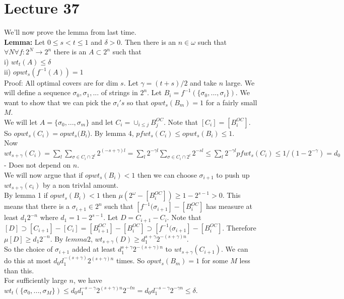 \documentclass{article}
\begin{document}
   \section{Lecture 37}
   We'll now prove the lemma from last time.\\
   \textbf{Lemma:} Let $0 \leq s < t \leq 1$ and $\delta > 0$. Then there is an $n \in \omega$ such that $\forall N \forall f: 2^N \to 2^n$ there is an $A \subset 2^n$ such that\\
   i) $wt_t(A) \leq \delta$\\
   ii) $opwt_s(f^{-1}(A))=1$\\
   Proof: All optimal covers are for dim $s$. Let $\gamma = (t+s)/2$ and take $n$ large. We will define a sequence $\sigma_0,\sigma_1, ...$ of strings in $2^n$. Let $B_i = f^{-1}(\{\sigma_0,...,\sigma_i\})$. We want to show that we can pick the $\sigma_i's$ so that $opwt_s(B_m) = 1$ for a fairly small $M$.\\
   We will let $A = \{\sigma_0,...,\sigma_m\}$ and let $C_i = \cup_{i\leq j} B_j^{OC}$. Note that $[C_i] = [B_i^{OC}]$. So $opwt_s(C_i) = opwt_s(B_i$). By lemma 4, $pfwt_s(C_i) \leq opwt_s(B_i) \leq 1$.\\
   Now $wt_{s+\gamma}(C_i) = \sum_l \sum_{\sigma \in C_i \cap 2^l} 2^{(-s+\gamma)l} = \sum_l 2^{-\gamma l} \sum_{\sigma \in C_i \cap 2^l} 2^{-sl} \leq \sum_l 2^{-\gamma l} pfwt_s(C_i) \leq 1/(1-2^{-\gamma}) = d_0$- Does not depend on $n$. \\
   We will now argue that if $opwt_s(B_i) < 1$ then we can choose $\sigma_{i+1}$ to push up $wt_{s+\gamma}(c_i)$ by a non trivlal amount.\\
   By lemma 1 if $opwt_s(B_i) < 1$ then $\mu(2^\omega - [B_i^{OC}]) \geq 1- 2^{s-1} > 0$. This means that there is a $\sigma_{i+1} \in 2^n$ such that $[f^{-1}(\sigma_{i+1} ] - [B_i^{OC}]$ has measure at least $d_1 2^{-n}$ where $d_1 = 1-2^{s-1}$. Let $D = C_{i+1 }- C_i$. Note that $[D] \supset [C_{i+1}] - [C_i] = [B_{i+1}^{OC}] - [B_i^{OC}] \supset [f^{-1}(\sigma_{i+1}] - [B_i^{OC}]$. Therefore $\mu[D] \geq d_1 2^{-n}$. By $lemma 2$, $wt_{s+\gamma}(D) \geq d_1^{s+\gamma} 2^{-(s+\gamma)n}$.\\
   So the choice of $\sigma_{i+1}$ added at least $d_1^{s+\gamma} 2^{-(s+\gamma)n}$ to $wt_{s+\gamma}(C_{i+1})$. We can do this at most $d_0 d_1^{-(s+\gamma)}2^{(s+\gamma)n}$ times. So $opwt_s(B_m) = 1$ for some $M$ less than this.\\
   For sufficiently large $n$, we have $wt_t(\{\sigma_0,...,\sigma_M\}) \leq d_0 d_1^{-s-\gamma}2^{(s+\gamma)n} 2^{-tn} = d_0 d_1^{-s-\gamma}2^{-\gamma n}\leq \delta$.\\\\
\end{document}
